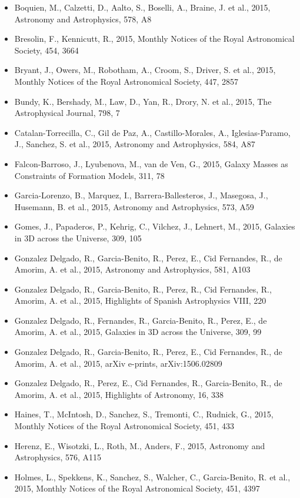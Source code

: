 \documentclass{letter}
\begin{document}
\begin{enumerate}
\begin{itemize}
\item Boquien, M., Calzetti, D., Aalto, S., Boselli, A., Braine, J. et al., 2015, Astronomy and Astrophysics, 578, A8
\item Bresolin, F., Kennicutt, R., 2015, Monthly Notices of the Royal Astronomical Society, 454, 3664
\item Bryant, J., Owers, M., Robotham, A., Croom, S., Driver, S. et al., 2015, Monthly Notices of the Royal Astronomical Society, 447, 2857
\item Bundy, K., Bershady, M., Law, D., Yan, R., Drory, N. et al., 2015, The Astrophysical Journal, 798, 7
\item Catalan-Torrecilla, C., Gil de Paz, A., Castillo-Morales, A., Iglesias-Paramo, J., Sanchez, S. et al., 2015, Astronomy and Astrophysics, 584, A87
\item Falcon-Barroso, J., Lyubenova, M., van de Ven, G., 2015, Galaxy Masses as Constraints of Formation Models, 311, 78
\item Garcia-Lorenzo, B., Marquez, I., Barrera-Ballesteros, J., Masegosa, J., Husemann, B. et al., 2015, Astronomy and Astrophysics, 573, A59
\item Gomes, J., Papaderos, P., Kehrig, C., Vilchez, J., Lehnert, M., 2015, Galaxies in 3D across the Universe, 309, 105
\item Gonzalez Delgado, R., Garcia-Benito, R., Perez, E., Cid Fernandes, R., de Amorim, A. et al., 2015, Astronomy and Astrophysics, 581, A103
\item Gonzalez Delgado, R., Garcia-Benito, R., Perez, R., Cid Fernandes, R., Amorim, A. et al., 2015, Highlights of Spanish Astrophysics VIII, 220
\item Gonzalez Delgado, R., Fernandes, R., Garcia-Benito, R., Perez, E., de Amorim, A. et al., 2015, Galaxies in 3D across the Universe, 309, 99
\item Gonzalez Delgado, R., Garcia-Benito, R., Perez, E., Cid Fernandes, R., de Amorim, A. et al., 2015, arXiv e-prints, arXiv:1506.02809
\item Gonzalez Delgado, R., Perez, E., Cid Fernandes, R., Garcia-Benito, R., de Amorim, A. et al., 2015, Highlights of Astronomy, 16, 338
\item Haines, T., McIntosh, D., Sanchez, S., Tremonti, C., Rudnick, G., 2015, Monthly Notices of the Royal Astronomical Society, 451, 433
\item Herenz, E., Wisotzki, L., Roth, M., Anders, F., 2015, Astronomy and Astrophysics, 576, A115
\item Holmes, L., Spekkens, K., Sanchez, S., Walcher, C., Garcia-Benito, R. et al., 2015, Monthly Notices of the Royal Astronomical Society, 451, 4397

\end{itemize}
\end{enumerate}
\end{document}
